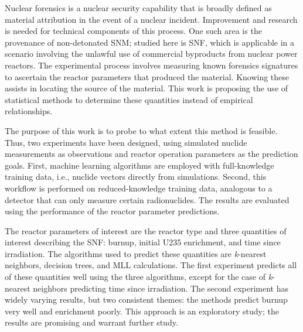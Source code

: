 Nuclear forensics is a nuclear security capability that is broadly defined as
material attribution in the event of a nuclear incident.  Improvement and
research is needed for technical components of this process.  One such area is
the provenance of non-detonated \gls{SNM}; studied here is \gls{SNF}, which is
applicable in a scenario involving the unlawful use of commercial byproducts
from nuclear power reactors.  The experimental process involves measuring known
forensics signatures to ascertain the reactor parameters that produced the
material. Knowing these assists in locating the source of the material. This
work is proposing the use of statistical methods to determine these quantities
instead of empirical relationships. 

The purpose of this work is to probe to what extent this method is feasible.
Thus, two experiments have been designed, using simulated nuclide measurements
as observations and reactor operation parameters as the prediction goals.
First, machine learning algorithms are employed with full-knowledge training
data, i.e., nuclide vectors directly from simulations.  Second, this workflow
is performed on reduced-knowledge training data, analogous to a detector that
can only measure certain radionuclides. The results are evaluated using the
performance of the reactor parameter predictions.

The reactor parameters of interest are the reactor type and three quantities of
interest describing the \gls{SNF}: burnup, initial \gls{U235} enrichment, and
time since irradiation. The algorithms used to predict these quantities are
\textit{k}-nearest neighbors, decision trees, and \gls{MLL} calculations. The
first experiment predicts all of these quantities well using the three
algorithms, except for the case of \textit{k}-nearest neighbors predicting time
since irradiation. The second experiment has widely varying results, but two
consistent themes: the methods predict burnup very well and enrichment poorly.
This approach is an exploratory study; the results are promising and warrant
further study.


